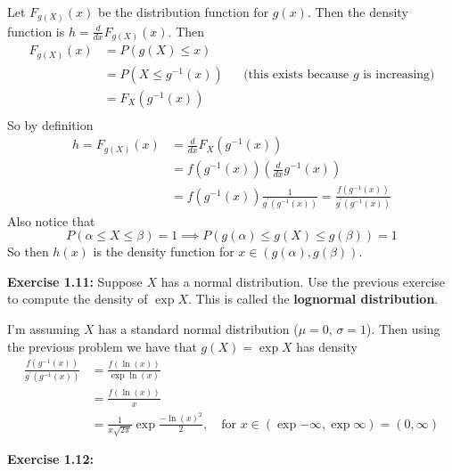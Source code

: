 \begin{mdframed}
    Let $F_{g(X)}(x)$ be the distribution function for $g(x)$. Then the density function is $h = \frac{d}{dx}F_{g(X)}(x)$. Then  
    \begin{align*}
        F_{g(X)}(x) &= P(g(X) \leq x) \\
        &= P(X \leq g^{-1}(x)) && \text{(this exists because $g$ is increasing)} \\
        &= F_X(g^{-1}(x)) \\
    \end{align*}
    So by definition 
    \begin{align*}
        h = F_{g(X)}(x) &= \frac{d}{dx}F_X(g^{-1}(x)) \\
        &=f(g^{-1}(x)) \left(\frac{d}{dx}g^{-1}(x) \right)\\
        &=f(g^{-1}(x))\frac{1}{g^\prime(g^{-1}(x))} = \frac{f(g^{-1}(x))}{g^\prime(g^{-1}(x))} 
    \end{align*}
    Also notice that 
    \[P(\alpha \leq X \leq \beta)=1 \implies P(g(\alpha) \leq g(X) \leq g(\beta)) = 1\]
    So then $h(x)$ is the density function for $x \in (g(\alpha), g(\beta))$.
\end{mdframed}
\textbf{Exercise 1.11:} Suppose $X$ has a normal distribution. Use the previous exercise to compute the density of $\exp{X}$. This is called the \textbf{lognormal distribution}.
\begin{mdframed}
    I'm assuming $X$ has a standard normal distribution ($\mu = 0, \, \sigma=1$). Then using the previous problem we have that $g(X) = \exp{X}$ has density
    \begin{align*}
        \frac{f(g^{-1} (x))}{g^\prime(g^{-1}(x))} &= \frac{f(\ln(x))}{\exp{\ln(x)}}\\
        &= \frac{f(\ln(x))}{x} \\
        &= \frac{1}{x\sqrt{2\pi}}\exp{\frac{-\ln(x)^2}{2}}, \quad \text{for $x \in (\exp{-\infty}, \exp{\infty}) = (0, \infty)$}
    \end{align*}
\end{mdframed}
\textbf{Exercise 1.12:} 
